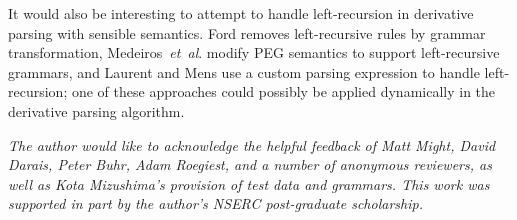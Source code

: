 \documentclass[submission,copyright,creativecommons]{eptcs}
\newcommand{\etal}{\textit{et~al}. }
\begin{document}
It would also be interesting to attempt to handle left-recursion in derivative parsing with sensible semantics. 
Ford \cite{For02} removes left-recursive rules by grammar transformation, Medeiros~\etal \cite{MMI14} modify PEG semantics to support left-recursive grammars, and Laurent and Mens \cite{LM15} use a custom parsing expression to handle left-recursion; one of these approaches could possibly be applied dynamically in the derivative parsing algorithm.

{\it The author would like to acknowledge the helpful feedback of Matt Might, David Darais, Peter Buhr, Adam Roegiest, and a number of anonymous reviewers, as well as Kota Mizushima's provision of test data and grammars. 
This work was supported in part by the author's NSERC post-graduate scholarship.}



\end{document}
